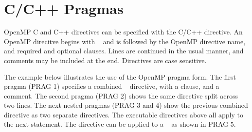 \section{C/C++ Pragmas}
\label{sec:pragmas}

OpenMP C and C++ directives can be specified with the C/C++  directive.
An OpenMP direcitve begins with ~ and is followed by the 
OpenMP directive name, and required and optional clauses. Lines are continued in the 
usual manner, and comments may be included at the end.
Directives are case sensitive.

The example below illustrates the use of the OpenMP pragma form.
The first pragma (PRAG 1) specifies a combined ~ 
directive, with a  clause, and a comment. 
The second pragma (PRAG 2) shows the same directive split
across two lines. The next nested pragmas (PRAG 3 and 4) show the previous combined directive as 
two separate directives. The executable directives above all apply to the next 
statement. The  directive can be applied to a ~
as shown in PRAG 5.

